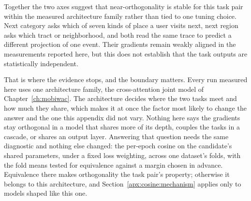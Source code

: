 
Together the two axes suggest that near-orthogonality is stable for this task pair within the
measured architecture family rather than tied to one tuning choice. Next
category asks which of seven kinds of place a user visits next, next region asks which tract or
neighborhood, and both read the same trace to predict a different projection of one event. Their
gradients remain weakly aligned in the measurements reported here, but this does not establish that
the task outputs are statistically independent.

That is where the evidence stops, and the boundary matters. Every run measured here uses one
architecture family, the cross-attention joint model of Chapter~\ref{ch:mobiwac}. The architecture
decides where the two tasks meet and how much they share, which makes it at once the factor most
likely to change the answer and the one this appendix did not vary. Nothing here says the gradients
stay orthogonal in a model that shares more of its depth, couples the tasks in a cascade, or shares
an output layer. %
Answering that question needs the same diagnostic and nothing else changed: the per-epoch
cosine on the candidate's shared parameters, under a fixed loss weighting, across one dataset's
folds, with the fold means tested for equivalence against a margin chosen in advance. Equivalence
there makes orthogonality the task pair's property; otherwise it belongs to this architecture, and
Section~\ref{apx:cosine:mechanism} applies only to models shaped like this one.

